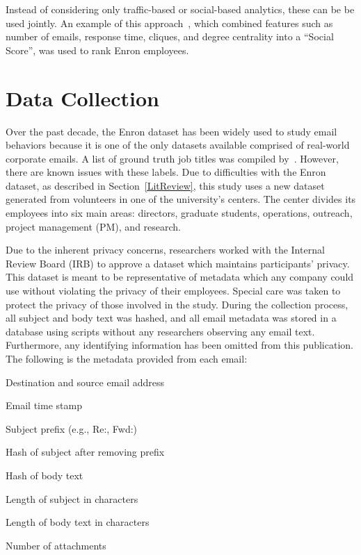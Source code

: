 \documentclass[12pt]{report}
\begin{document}
Instead of considering only traffic-based or social-based analytics, these can be be used jointly.
An example of this approach~\cite{rowe_automated_2007}, which combined features such as number of emails, response time, cliques, and degree centrality into a ``Social Score'', was used to rank Enron employees.  

\chapter{Data Collection} \label{DataCollection}

Over the past decade, the Enron dataset has been widely used to study email behaviors because it is one of the only datasets available comprised of real-world corporate emails.
A list of ground truth job titles was compiled by~\cite{shetty_status_2004}.  However, there are known issues with these labels.
Due to difficulties with the Enron dataset, as described in Section~\ref{LitReview}, this study uses a new dataset generated from volunteers in one of the university's centers.
The center divides its employees into six main areas: directors, graduate students, operations, outreach, project management (PM), and research.

Due to the inherent privacy concerns, researchers worked with the Internal Review Board (IRB) to approve a dataset which maintains participants' privacy.
This dataset is meant to be representative of metadata which any company could use without violating the privacy of their employees.
Special care was taken to protect the privacy of those involved in the study.
During the collection process, all subject and body text was hashed, and all email metadata was stored in a database using scripts without any researchers observing any email text.
Furthermore, any identifying information has been omitted from this publication.
The following is the metadata provided from each email:
\begin{compactitem}
\item Destination and source email address
\item Email time stamp
\item Subject prefix (e.g., Re:, Fwd:)
\item Hash of subject after removing prefix
\item Hash of body text
\item Length of subject in characters
\item Length of body text in characters
\item Number of attachments
\end{compactitem}
\end{document}
